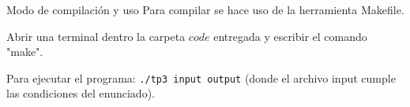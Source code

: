 \begin{section}{Modo de compilación y uso}
	Para compilar se hace uso de la herramienta Makefile.
	
	Abrir una terminal dentro la carpeta $code$ entregada y escribir el comando "make".
	
	Para ejecutar el programa: \texttt{./tp3 input output} (donde el archivo input cumple las condiciones del enunciado).
\end{section}